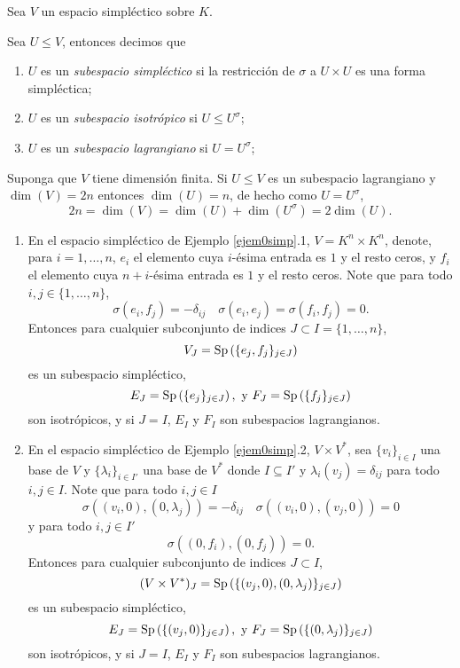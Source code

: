Sea $V$ un espacio simpl\'ectico sobre $K$.

\begin{defn}
Sea $U\le V$, entonces decimos que
\begin{enumerate}
\item $U$ es un \emph{subespacio simpl\'ectico} si la restricci\'on de $\sigma$ a $U\times U$ es una forma simpl\'ectica;
\item $U$ es un \emph{subespacio isotr\'opico} si $U\le U^\sigma$; 
\item $U$ es un \emph{subespacio lagrangiano} si $U=U^\sigma$;
\end{enumerate}
\end{defn}

\begin{obs}
Suponga que $V$ tiene dimensi\'on finita. Si $U\le V$ es un subespacio lagrangiano y $\dim(V)=2n$ entonces $\dim(U)=n$, de hecho como $U=U^\sigma$, 
\[
2n=\dim(V)=\dim(U)+\dim(U^\sigma)=2\dim(U).
\]
\end{obs}

\begin{ejem}
\begin{enumerate}
\item En el espacio simpl\'ectico de Ejemplo \ref{ejem0simp}.1, $V=K^n\times K^n$, denote, para $i=1,\ldots,n$, $e_i$ el elemento cuya $i$-\'esima entrada es $1$ y el resto ceros, y $f_i$ el elemento cuya $n+i$-\'esima entrada es $1$ y el resto ceros. Note que para todo $i,j\in\{1,\ldots,n\}$,
\[
\sigma(e_i,f_j)=-\delta_{ij}\quad\sigma(e_i,e_j)=\sigma(f_i,f_j)=0.
\]
Entonces para cualquier subconjunto de indices $J\subset I=\{1,\ldots,n\}$,
\[
V_J=\operatorname{Sp}\left(\{e_j,f_j\}_{j\in J}\right)
\]
es un subespacio simpl\'ectico,
\[
E_J=\operatorname{Sp}\left(\{e_j\}_{j\in J}\right),\textrm{ y } F_J=\operatorname{Sp}\left(\{f_j\}_{j\in J}\right)
\]
son isotr\'opicos, y si $J=I$, $E_I$ y $F_I$ son subespacios lagrangianos.
\item  En el espacio simpl\'ectico de Ejemplo \ref{ejem0simp}.2, $V\times V^*$, sea $\{v_i\}_{i\in I}$ una base de $V$ y $\{\lambda_i\}_{i\in I'}$ una base de $V^*$ donde $I\subseteq I'$ y $\lambda_i(v_j)=\delta_{ij}$ para todo $i,j\in I$. Note que para todo $i,j\in I$
\[
\sigma\left((v_i,0),(0,\lambda_j)\right)=-\delta_{ij}\quad\sigma\left((v_i,0),(v_j,0)\right)=0
\]
y para todo $i,j\in I'$
\[
\sigma\left((0,f_i),(0,f_j)\right)=0.
\]
Entonces para cualquier subconjunto de indices $J\subset I$,
\[
(V\times V^*)_J=\operatorname{Sp}\left(\{(v_j,0),(0,\lambda_j)\}_{j\in J}\right)
\]
es un subespacio simpl\'ectico,
\[
E_J=\operatorname{Sp}\left(\{(v_j,0)\}_{j\in J}\right),\textrm{ y } F_J=\operatorname{Sp}\left(\{(0,\lambda_j)\}_{j\in J}\right)
\]
son isotr\'opicos, y si $J=I$, $E_I$ y $F_I$ son subespacios lagrangianos.
\end{enumerate}
\end{ejem}

